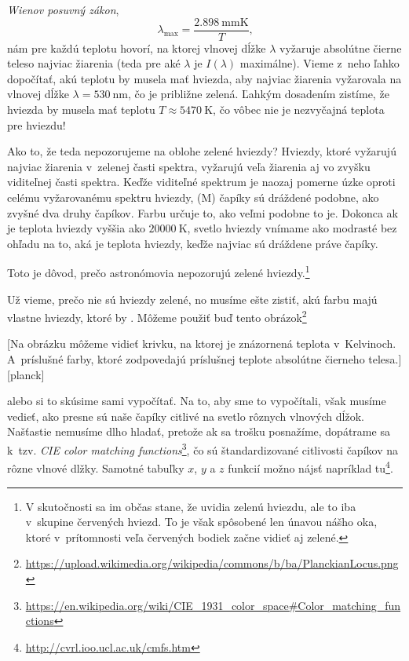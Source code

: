 \emph{Wienov posuvný zákon},
$$
  \lambda_{\text{max}} = \frac{\SI{2.898}{\milli\metre\kelvin}}{T}\text{,}
$$
nám pre každú teplotu hovorí, na ktorej vlnovej dĺžke $\lambda$ vyžaruje absolútne čierne teleso najviac žiarenia (teda pre aké $\lambda$ je $I(\lambda)$ maximálne). Vieme z~neho ľahko dopočítať, akú teplotu by musela mať hviezda, aby najviac žiarenia vyžarovala na vlnovej dĺžke $\lambda = \SI{530}{\nano\metre}$, čo je približne zelená.
Ľahkým dosadením zistíme, že hviezda by musela mať teplotu $T \approx \SI{5470}{\kelvin}$, čo vôbec nie je nezvyčajná teplota pre hviezdu! 

Ako to, že teda nepozorujeme na oblohe zelené hviezdy? Hviezdy, ktoré vyžarujú najviac žiarenia v~zelenej časti spektra, vyžarujú veľa žiarenia aj vo zvyšku viditeľnej časti spektra.
Keďže viditeľné spektrum je naozaj pomerne úzke oproti celému vyžarovanému spektru hviezdy,  (M) čapíky sú dráždené podobne, ako zvyšné dva druhy čapíkov.
Farbu určuje to, ako veľmi podobne to je. Dokonca ak je teplota hviezdy vyššia ako $\SI{20000}{\kelvin}$, svetlo hviezdy vnímame ako modrasté bez ohľadu na to, aká je teplota hviezdy,
keďže najviac sú dráždene práve  čapíky.

Toto je dôvod, prečo astronómovia nepozorujú zelené hviezdy.\footnote{V skutočnosti sa im občas stane,
že uvidia zelenú hviezdu, ale to iba v~skupine červených hviezd. To je však spôsobené len únavou nášho oka, ktoré v~prítomnosti veľa červených bodiek začne vidieť aj zelené.}

Už vieme, prečo nie sú hviezdy zelené, no musíme ešte zistiť, akú farbu majú vlastne hviezdy, ktoré by .
Môžeme použiť buď tento obrázok\footnote{\url{https://upload.wikimedia.org/wikipedia/commons/b/ba/PlanckianLocus.png}}

[Na obrázku môžeme vidieť krivku, na ktorej je znázornená teplota v~Kelvinoch. A~príslušné farby, ktoré zodpovedajú príslušnej teplote absolútne čierneho telesa.][planck]

alebo si to skúsime sami vypočítať. Na to, aby sme to vypočítali, však musíme vedieť, ako presne sú naše čapíky citlivé na svetlo rôznych vlnových dĺžok.
Našťastie nemusíme dlho hladať, pretože ak sa trošku posnažíme, dopátrame sa k~tzv.
\emph{CIE color matching functions}\footnote{\url{https://en.wikipedia.org/wiki/CIE_1931_color_space\#Color_matching_functions}},
čo sú štandardizované citlivosti čapíkov na rôzne vlnové dlžky. Samotné tabuľky $x$, $y$ a $z$ funkcií možno nájsť napríklad tu\footnote{\url{http://cvrl.ioo.ucl.ac.uk/cmfs.htm}}.

